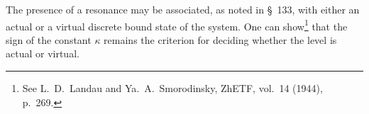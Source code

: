 The presence of a resonance may be associated, as noted in \S~133, with either an actual or a virtual
discrete bound state of the system. One can show\footnote{See L.~D.~Landau and Ya.~A.~Smorodinsky, ZhETF, vol.~14 (1944), p.~269.} that the sign of the constant $\kappa$ remains the criterion for deciding whether the level is actual or virtual.
